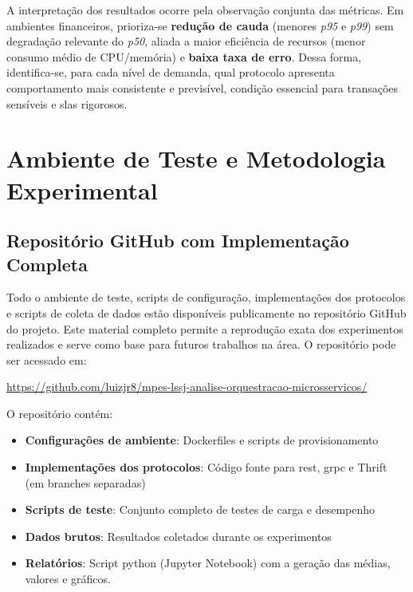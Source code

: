 A interpretação dos resultados ocorre pela observação conjunta das métricas. Em ambientes financeiros, prioriza-se \textbf{redução de cauda} (menores \textit{p95} e \textit{p99}) sem degradação relevante do \textit{p50}, aliada a maior eficiência de recursos (menor consumo médio de CPU/memória) e \textbf{baixa taxa de erro}. Dessa forma, identifica-se, para cada nível de demanda, qual protocolo apresenta comportamento mais consistente e previsível, condição essencial para transações sensíveis e \acrshort{sla}s rigorosos.

\section{Ambiente de Teste e Metodologia Experimental}
\label{sec:ambiente_teste}

\subsection{Repositório GitHub com Implementação Completa}
\label{subsec:repositorio_github}

Todo o ambiente de teste, scripts de configuração, implementações dos protocolos e scripts de coleta de dados estão disponíveis publicamente no repositório GitHub do projeto. Este material completo permite a reprodução exata dos experimentos realizados e serve como base para futuros trabalhos na área. O repositório pode ser acessado em:

\begin{center}
\url{https://github.com/luizjr8/mpes-lssj-analise-orquestracao-microsservicos/}
\end{center}

O repositório contém:

\begin{itemize}
\item \textbf{Configurações de ambiente}: Dockerfiles e scripts de provisionamento
\item \textbf{Implementações dos protocolos}: Código fonte para \acrshort{rest}, \acrshort{grpc} e Thrift (em branches separadas)
\item \textbf{Scripts de teste}: Conjunto completo de testes de carga e desempenho
\item \textbf{Dados brutos}: Resultados coletados durante os experimentos
\item \textbf{Relatórios}: Script python (Jupyter Notebook) com a geração das médias, valores e gráficos.
\end{itemize}

